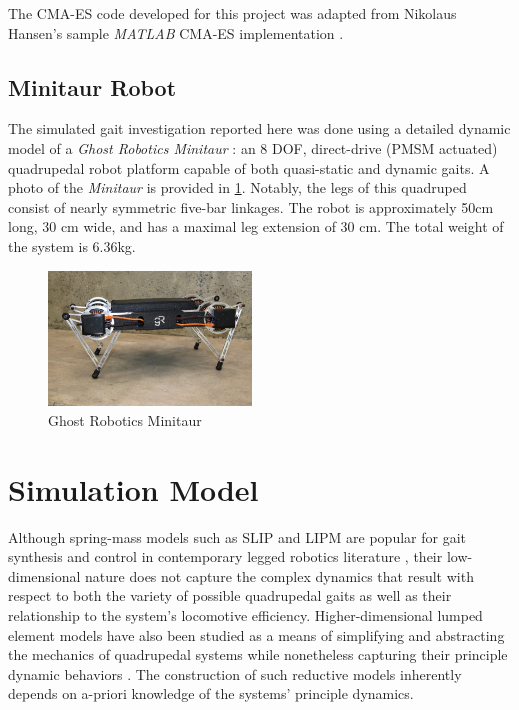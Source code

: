 \documentclass[conference,11pt,letterpaper]{IEEEtran}
\begin{document}
The CMA-ES code developed for this project was adapted from Nikolaus Hansen's sample \emph{MATLAB} CMA-ES implementation \autocite{Hansen2011}. 


\subsection{Minitaur Robot}

The simulated gait investigation reported here was done using a detailed dynamic model of a \emph{Ghost Robotics Minitaur} \autocite{grminitaur}: an 8 DOF, direct-drive (PMSM actuated) quadrupedal robot platform capable of both quasi-static and dynamic gaits. A photo of the \emph{Minitaur} is provided in \cref{fig:grminitaur}. Notably, the legs of this quadruped consist of nearly symmetric five-bar linkages. The robot is approximately 50\si{\centi\m} long, 30 \si{\centi\m} wide, and has a maximal leg extension of 30 \si{\centi\m}. The total weight of the system is 6.36\si{\kg}.

\begin{figure}[ht!]
    \centering
    \includegraphics[width=0.48\textwidth]{grminitaur}
    \caption{Ghost Robotics Minitaur \autocite{grminitaur}}
    \label{fig:grminitaur}
\end{figure}

\section{Simulation Model}

Although spring-mass models such as SLIP and LIPM are popular for gait synthesis and control in contemporary legged robotics literature \autocite{albertwuhartmutgeyer2013}, their low-dimensional nature does not capture the complex dynamics that result with respect to both the variety of possible quadrupedal gaits as well as their relationship to the system's locomotive efficiency. Higher-dimensional lumped element models have also been studied as a means of simplifying and abstracting the mechanics of quadrupedal systems while nonetheless capturing their principle dynamic behaviors \autocite{remy2011optimal,full1999templates}. The construction of such reductive models inherently depends on a-priori knowledge of the systems' principle dynamics.
\end{document}
